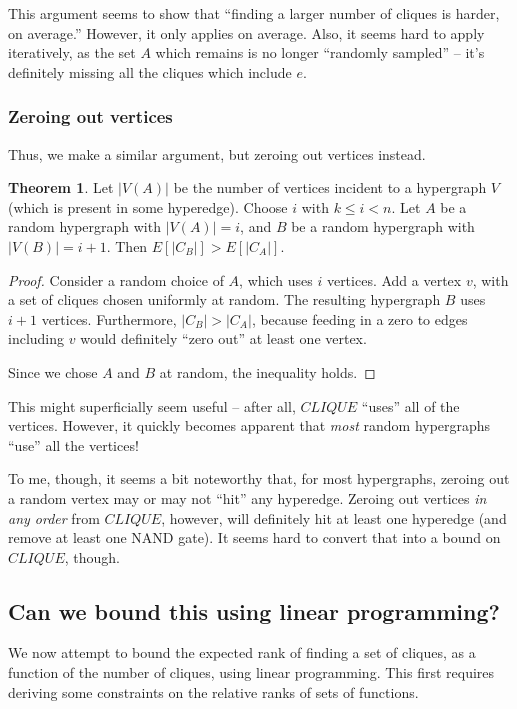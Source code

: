 \documentclass[12pt]{article}
\theoremstyle{definition}
\newtheorem{thm}{Theorem}[section]
\begin{document}
This argument seems to show that ``finding a larger number of cliques is
harder, on average.'' However, it only applies
on average. Also, it seems hard to apply iteratively, as the set $A$ which
remains is no longer ``randomly sampled'' -- it's definitely missing
all the cliques which include $e$.

\subsubsection{Zeroing out vertices}

Thus, we make a similar argument, but zeroing out vertices instead.

\begin{thm}
\label{vertexZonking}
Let $|V(A)|$ be the number of vertices incident to a hypergraph $V$
(which is present in some hyperedge).
Choose $i$ with $k \le i < n$.
Let $A$ be a random hypergraph with $|V(A)| = i$, and
$B$ be a random hypergraph with $|V(B)| = i+1$. Then
$E[|C_B|] > E[|C_A|]$.
\end{thm}
\begin{proof}
Consider a random choice of $A$, which uses $i$ vertices.
Add a vertex $v$, with a set of cliques chosen uniformly at
random. The resulting hypergraph $B$ uses $i+1$ vertices.
Furthermore, $|C_B| > |C_A|$, because feeding in a zero to edges
including $v$ would definitely ``zero out'' at least one
vertex.

Since we chose $A$ and $B$ at random, the inequality holds.
\end{proof}

This might superficially seem useful -- after all, $CLIQUE$
``uses'' all of the vertices. However,
it quickly becomes apparent that {\em most} random hypergraphs
``use'' all the vertices!

To me, though, it seems a bit noteworthy that, for most
hypergraphs, zeroing out a random vertex may or may not
``hit'' any hyperedge. Zeroing out vertices {\em in any order}
from $CLIQUE$, however, will definitely hit at least one
hyperedge (and remove at least one NAND gate). It seems
hard to convert that into a bound on $CLIQUE$, though.

\subsection{Can we bound this using linear programming?}

We now attempt to bound the expected rank of finding a set
of cliques, as a function of the number of cliques, using
linear programming.
This first requires deriving some constraints on the
relative ranks of sets of functions.
\end{document}

